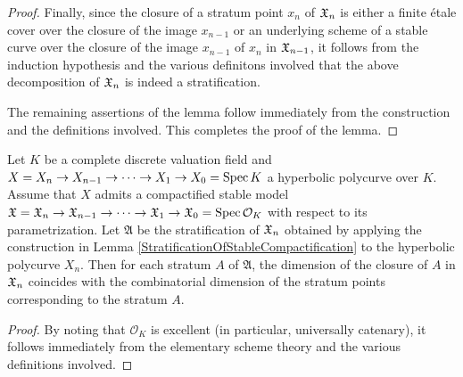 \begin{proof}
  Finally, since the closure of a stratum point $x_n$ of $\mathfrak{X}_n$ is either a finite \'{e}tale cover over the closure of the image $x_{n - 1}$ or an underlying scheme of a stable curve over the closure of the image $x_{n - 1}$ of $x_n$ in $\mathfrak{X}_{n - 1}$, it follows from the induction hypothesis and the various definitons involved that the above decomposition of $\mathfrak{X}_n$ is indeed a stratification.

  The remaining assertions of the lemma follow immediately from the construction and the definitions involved. This completes the proof of the lemma.
\end{proof}

\begin{lem}\label{DimensionOfStrataOfStableCompactification}
  Let $K$ be a complete discrete valuation field and $X = X_n \to X_{n - 1} \to \cdots \to X_1 \to X_0 = \mathrm{Spec} \, K$ a hyperbolic polycurve over $K$. Assume that $X$ admits a compactified stable model $\mathfrak{X} = \mathfrak{X}_n \to \mathfrak{X}_{n - 1} \to \cdots \to \mathfrak{X}_1 \to \mathfrak{X}_0 = \mathrm{Spec} \, \mathcal{O}_K$ with respect to its parametrization. Let $\mathfrak{A}$ be the stratification of $\mathfrak{X}_n$ obtained by applying the construction in Lemma \ref{StratificationOfStableCompactification} to the hyperbolic polycurve $X_n$. Then for each stratum $A$ of $\mathfrak{A}$, the dimension of the closure of $A$ in $\mathfrak{X}_n$ coincides with the combinatorial dimension of the stratum points corresponding to the stratum $A$.
\end{lem}
\begin{proof}
  By noting that $\mathcal{O}_K$ is excellent (in particular, universally catenary), it follows immediately from the elementary scheme theory and the various definitions involved.
\end{proof}

